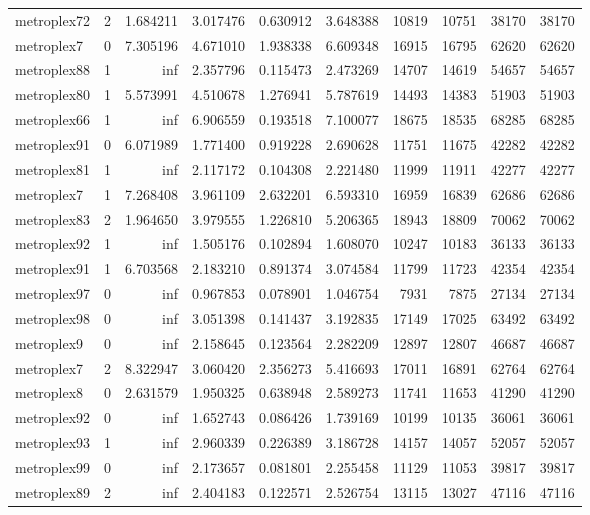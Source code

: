 \begin{longtable}{|l|r|r|r|r|r|r|r|r|r|}
metroplex72 & 2 & 1.684211 & 3.017476 & 0.630912 & 3.648388 & 10819 & 10751 & 38170 & 38170 \\
metroplex7 & 0 & 7.305196 & 4.671010 & 1.938338 & 6.609348 & 16915 & 16795 & 62620 & 62620 \\
metroplex88 & 1 & inf & 2.357796 & 0.115473 & 2.473269 & 14707 & 14619 & 54657 & 54657 \\
metroplex80 & 1 & 5.573991 & 4.510678 & 1.276941 & 5.787619 & 14493 & 14383 & 51903 & 51903 \\
metroplex66 & 1 & inf & 6.906559 & 0.193518 & 7.100077 & 18675 & 18535 & 68285 & 68285 \\
metroplex91 & 0 & 6.071989 & 1.771400 & 0.919228 & 2.690628 & 11751 & 11675 & 42282 & 42282 \\
metroplex81 & 1 & inf & 2.117172 & 0.104308 & 2.221480 & 11999 & 11911 & 42277 & 42277 \\
metroplex7 & 1 & 7.268408 & 3.961109 & 2.632201 & 6.593310 & 16959 & 16839 & 62686 & 62686 \\
metroplex83 & 2 & 1.964650 & 3.979555 & 1.226810 & 5.206365 & 18943 & 18809 & 70062 & 70062 \\
metroplex92 & 1 & inf & 1.505176 & 0.102894 & 1.608070 & 10247 & 10183 & 36133 & 36133 \\
metroplex91 & 1 & 6.703568 & 2.183210 & 0.891374 & 3.074584 & 11799 & 11723 & 42354 & 42354 \\
metroplex97 & 0 & inf & 0.967853 & 0.078901 & 1.046754 & 7931 & 7875 & 27134 & 27134 \\
metroplex98 & 0 & inf & 3.051398 & 0.141437 & 3.192835 & 17149 & 17025 & 63492 & 63492 \\
metroplex9 & 0 & inf & 2.158645 & 0.123564 & 2.282209 & 12897 & 12807 & 46687 & 46687 \\
metroplex7 & 2 & 8.322947 & 3.060420 & 2.356273 & 5.416693 & 17011 & 16891 & 62764 & 62764 \\
metroplex8 & 0 & 2.631579 & 1.950325 & 0.638948 & 2.589273 & 11741 & 11653 & 41290 & 41290 \\
metroplex92 & 0 & inf & 1.652743 & 0.086426 & 1.739169 & 10199 & 10135 & 36061 & 36061 \\
metroplex93 & 1 & inf & 2.960339 & 0.226389 & 3.186728 & 14157 & 14057 & 52057 & 52057 \\
metroplex99 & 0 & inf & 2.173657 & 0.081801 & 2.255458 & 11129 & 11053 & 39817 & 39817 \\
metroplex89 & 2 & inf & 2.404183 & 0.122571 & 2.526754 & 13115 & 13027 & 47116 & 47116 \\

\end{longtable}
